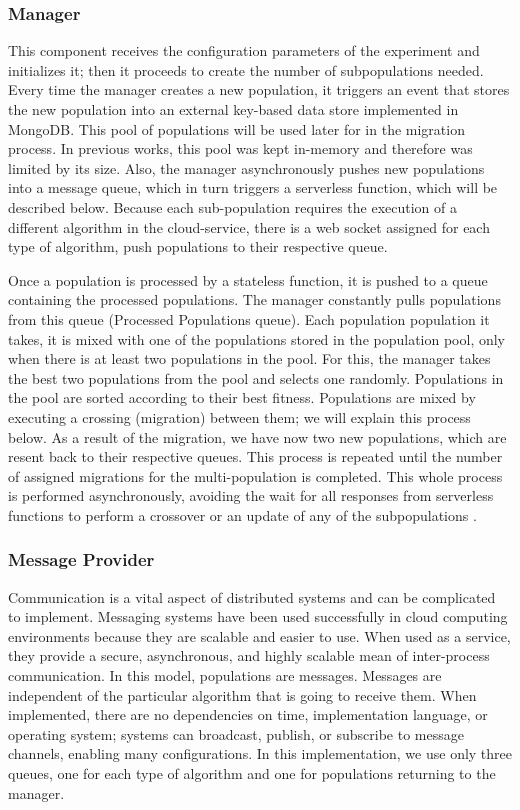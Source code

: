 \documentclass[runningheads]{llncs}
\begin{document}
\subsubsection{Manager}

This component receives the configuration parameters of
  the experiment and initializes it; then it proceeds to create the
  number of subpopulations needed. Every time the manager creates a new
  population, it triggers an event that stores the new population into 
  an external key-based data store implemented in MongoDB.  
  This pool of populations will be used later for in 
  the migration process. In previous works, this pool was kept in-memory and
  therefore was limited by its size. Also, the manager asynchronously 
  pushes new populations into a message queue,
  which in turn triggers a serverless function, which will be
  described below. Because each sub-population requires the execution 
  of a different algorithm in the cloud-service, there is a web socket 
  assigned for each type of algorithm, push populations to
  their respective queue.

  Once a population is processed by a stateless function, it is 
  pushed to a queue containing the processed populations. 
  The manager constantly pulls populations from this queue
  (Processed Populations queue). Each population population it takes,
  it is mixed with one of the populations stored in the population pool, only when 
  there is at least two populations in the pool.
  For this, the manager takes the best two populations from
  the pool and selects one randomly. Populations in the pool are
  sorted according to their best fitness. Populations are mixed by executing
  a crossing (migration) between them; we will explain this process below. As a result of
  the migration, we have now two new populations, which are resent back
  to their respective queues. This process is repeated until the number of
  assigned migrations for the multi-population \cite{Ma2019,Santander-jim2018}
  is completed. 
  This whole
  process is performed asynchronously, avoiding the wait for all responses from
  serverless functions to perform a crossover or an update of any of the
  subpopulations \cite{Lovbjerg2001,Jimeno2019}. 

  \subsubsection{Message Provider}

  Communication is a vital aspect of distributed
systems and can be complicated to implement. Messaging systems have been used
successfully in cloud computing environments because they are scalable and
easier to use. When used as a service, they provide a secure, asynchronous, and
highly scalable mean of inter-process communication.  In this model, populations
are messages.  Messages are independent of the particular algorithm that is
going to receive them. When implemented, there are no dependencies on time,
implementation language, or operating system; systems can broadcast, publish, or
subscribe to message channels, enabling many configurations. In this
implementation,  we use only three queues, one for each type of algorithm and
one for populations returning to the manager.
\end{document}
